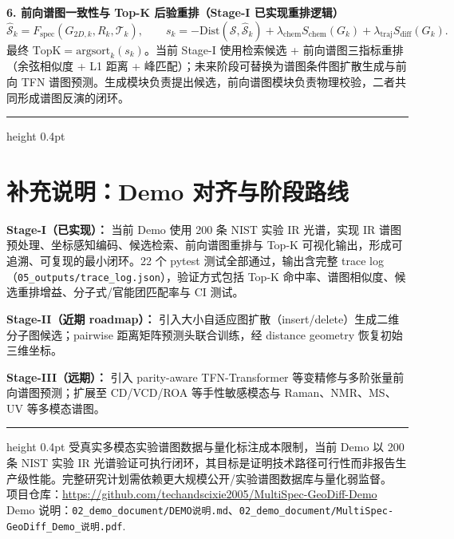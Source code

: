 \documentclass[10pt,a4paper]{ctexart}
\newcommand{\spec}{\mathcal S}
\begin{document}
\vspace{2pt}
\textbf{6. 前向谱图一致性与 Top-K 后验重排（Stage-I 已实现重排逻辑）}
\[
\hat{\spec}_k = F_{\mathrm{spec}}(G_{2D,k}, R_k, \mathcal T_k),\qquad
s_k = -\mathrm{Dist}(\spec, \hat{\spec}_k) + \lambda_{\mathrm{chem}} S_{\mathrm{chem}}(G_k) + \lambda_{\mathrm{traj}} S_{\mathrm{diff}}(G_k).
\]
最终 $\mathrm{TopK} = \mathrm{argsort}_k(s_k)$。当前 Stage-I 使用检索候选 + 前向谱图三指标重排（余弦相似度 + L1 距离 + 峰匹配）；未来阶段可替换为谱图条件图扩散生成与前向 TFN 谱图预测。生成模块负责提出候选，前向谱图模块负责物理校验，二者共同形成谱图反演的闭环。

\vspace{4pt}
\hrule height 0.4pt
\vspace{4pt}

\section*{补充说明：Demo 对齐与阶段路线}

\textbf{Stage-I（已实现）：}
当前 Demo 使用 200 条 NIST 实验 IR 光谱，实现 IR 谱图预处理、坐标感知编码、候选检索、前向谱图重排与 Top-K 可视化输出，形成可追溯、可复现的最小闭环。22 个 pytest 测试全部通过，输出含完整 trace log（\texttt{05\_outputs/trace\_log.json}），验证方式包括 Top-K 命中率、谱图相似度、候选重排增益、分子式/官能团匹配率与 CI 测试。

\textbf{Stage-II（近期 roadmap）：}
引入大小自适应图扩散（insert/delete）生成二维分子图候选；pairwise 距离矩阵预测头联合训练，经 distance geometry 恢复初始三维坐标。

\textbf{Stage-III（远期）：}
引入 parity-aware TFN-Transformer 等变精修与多阶张量前向谱图预测；扩展至 CD/VCD/ROA 等手性敏感模态与 Raman、NMR、MS、UV 等多模态谱图。

\vspace{4pt}
\hrule height 0.4pt
\vspace{3pt}
{\small
受真实多模态实验谱图数据与量化标注成本限制，当前 Demo 以 200 条 NIST 实验 IR 光谱验证可执行闭环，其目标是证明技术路径可行性而非报告生产级性能。完整研究计划需依赖更大规模公开/实验谱图数据库与量化弱监督。\\
项目仓库：\url{https://github.com/techandscixie2005/MultiSpec-GeoDiff-Demo}\quad
Demo 说明：\texttt{02\_demo\_document/DEMO说明.md}、\texttt{02\_demo\_document/MultiSpec-GeoDiff\_Demo\_说明.pdf}.
}
\end{document}
